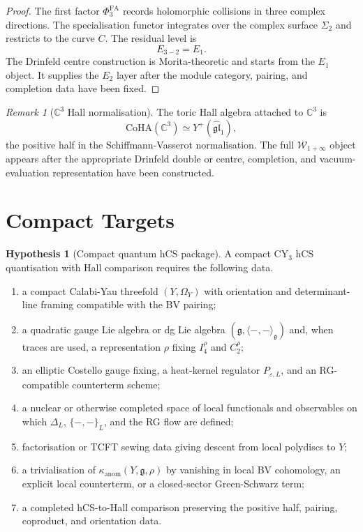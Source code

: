 \documentclass[11pt]{amsart}
\providecommand{\C}{\mathbb{C}}
\providecommand{\g}{\mathfrak{g}}
\providecommand{\CoHA}{\mathrm{CoHA}}
\providecommand{\Yp}{Y^{+}}
\providecommand{\Woneinf}{\mathcal{W}_{1+\infty}}
\providecommand{\PhiFA}{\Phi^{\mathrm{FA}}}
\providecommand{\kanom}{\kappa_{\mathrm{anom}}}
\theoremstyle{plain}
\theoremstyle{definition}
\newtheorem{hypothesis}[theorem]{Hypothesis}
\theoremstyle{remark}
\newtheorem{remark}[theorem]{Remark}
\begin{document}
\begin{proof}
The first factor \(\PhiFA_3\) records holomorphic collisions in three
complex directions. The specialisation functor integrates over the
complex surface \(\Sigma_2\) and restricts to the curve \(C\). The
residual level is
\[
 E_{3-2}=E_1.
\]
The Drinfeld centre construction is Morita-theoretic and starts from
the \(E_1\) object. It supplies the \(E_2\) layer after the module
category, pairing, and completion data have been fixed.
\end{proof}

\begin{remark}[$\C^3$ Hall normalisation]\label{rem:e2-c3-coha}
The toric Hall algebra attached to \(\C^3\) is
\[
 \CoHA(\C^3)\simeq \Yp(\widehat{\mathfrak{gl}}_1),
\]
the positive half in the Schiffmann-Vasserot normalisation. The full
\(\Woneinf\) object appears after the appropriate Drinfeld double or
centre, completion, and vacuum-evaluation representation have been
constructed.
\end{remark}

\section{Compact Targets}

\begin{hypothesis}[Compact quantum hCS package]\label{hyp:e2-compact-package}
A compact CY\(_3\) hCS quantisation with Hall comparison requires the
following data.
\begin{enumerate}
\item a compact Calabi-Yau threefold \((Y,\Omega_Y)\) with orientation
and determinant-line framing compatible with the BV pairing;
\item a quadratic gauge Lie algebra or dg Lie algebra
\((\g,\langle-,-\rangle_\g)\) and, when traces are used, a
representation \(\rho\) fixing \(I_4^\rho\) and \(C_2^\rho\);
\item an elliptic Costello gauge fixing, a heat-kernel regulator
\(P_{\varepsilon,L}\), and an RG-compatible counterterm scheme;
\item a nuclear or otherwise completed space of local functionals and
observables on which \(\Delta_L\), \(\{-,-\}_L\), and the RG flow are
defined;
\item factorisation or TCFT sewing data giving descent from local
polydiscs to \(Y\);
\item a trivialisation of \(\kanom(Y,\g,\rho)\) by vanishing in local BV
cohomology, an explicit local counterterm, or a closed-sector
Green-Schwarz term;
\item a completed hCS-to-Hall comparison preserving the positive half,
pairing, coproduct, and orientation data.
\end{enumerate}
\end{hypothesis}
\end{document}
